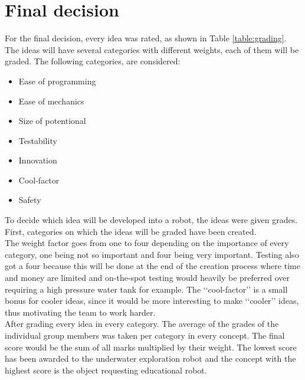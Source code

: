\documentclass[11pt,twoside,a4paper]{report}
\begin{document}
\section{Final decision}
For the final decision, every idea was rated, as shown in Table \ref{table:grading}. The ideas will have several categories with different weights, each of them will be graded. The following categories, are considered:
\begin{itemize}
\item Ease of programming
\item Ease of mechanics
\item Size of potentional
\item Testability
\item Innovation
\item Cool-factor
\item Safety
\end{itemize}
To decide which idea will be developed into a robot, the ideas were given grades. First, categories on which the ideas will be graded have been created.\\
The weight factor goes from one to four depending on the importance of every category, one being not so important and four being very important. Testing also got a four because this will be done at the end of the creation process where time and money are limited and on-the-spot testing would heavily be preferred over requiring a high pressure water tank for example. The \lq\lq{}cool-factor\rq\rq{} is a small bonus for cooler ideas, since it would be more interesting to make \lq\lq{}cooler\rq\rq{} ideas, thus motivating the team to work harder.\\
After grading every idea in every category. The average of the grades of the individual group members was taken per category in every concept. The final score would be the sum of all marks multiplied by their weight. The lowest score has been awarded to the underwater exploration robot and the concept with the highest score is the object requesting educational robot. 
\end{document}
